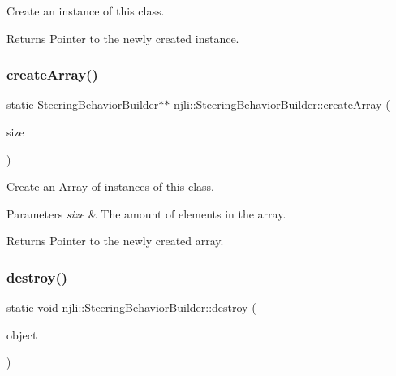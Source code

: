 Create an instance of this class.

\begin{DoxyReturn}{Returns}
Pointer to the newly created instance. 
\end{DoxyReturn}
\mbox{\label{classnjli_1_1_steering_behavior_builder_a9443fbf6e5f32e9c774c7cf9dafa0b87}} 
\subsubsection{\texorpdfstring{create\+Array()}{createArray()}}
{\footnotesize\ttfamily static \mbox{\hyperlink{classnjli_1_1_steering_behavior_builder}{Steering\+Behavior\+Builder}}$\ast$$\ast$ njli\+::\+Steering\+Behavior\+Builder\+::create\+Array (\begin{DoxyParamCaption}\item[{const \mbox{\hyperlink{_util_8h_a10e94b422ef0c20dcdec20d31a1f5049}{u32}}}]{size }\end{DoxyParamCaption})\hspace{0.3cm}{\ttfamily [static]}}

Create an Array of instances of this class.


\begin{DoxyParams}{Parameters}
{\em size} & The amount of elements in the array.\\
\hline
\end{DoxyParams}
\begin{DoxyReturn}{Returns}
Pointer to the newly created array. 
\end{DoxyReturn}
\mbox{\label{classnjli_1_1_steering_behavior_builder_aaad70995c2b65dd3e06a787bfdb8a9f5}} 
\subsubsection{\texorpdfstring{destroy()}{destroy()}}
{\footnotesize\ttfamily static \mbox{\hyperlink{_thread_8h_af1e856da2e658414cb2456cb6f7ebc66}{void}} njli\+::\+Steering\+Behavior\+Builder\+::destroy (\begin{DoxyParamCaption}\item[{\mbox{\hyperlink{classnjli_1_1_steering_behavior_builder}{Steering\+Behavior\+Builder}} $\ast$}]{object }\end{DoxyParamCaption})\hspace{0.3cm}{\ttfamily [static]}}

